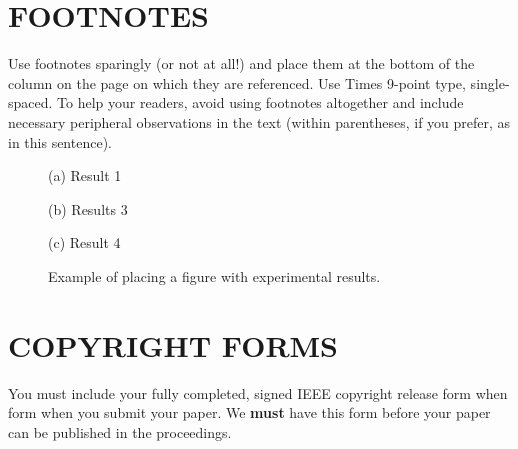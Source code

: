 \documentclass{article}
\begin{document}
\section{FOOTNOTES}
\label{sec:foot}

Use footnotes sparingly (or not at all!) and place them at the bottom of the
column on the page on which they are referenced. Use Times 9-point type,
single-spaced. To help your readers, avoid using footnotes altogether and
include necessary peripheral observations in the text (within parentheses, if
you prefer, as in this sentence).

\begin{figure}[htb]

\begin{minipage}[b]{1.0\linewidth}
  \centering
  \centerline{(a) Result 1}\medskip
\end{minipage}
%
\begin{minipage}[b]{.48\linewidth}
  \centering
  \centerline{(b) Results 3}\medskip
\end{minipage}
\hfill
\begin{minipage}[b]{0.48\linewidth}
  \centering
  \centerline{(c) Result 4}\medskip
\end{minipage}
%
\caption{Example of placing a figure with experimental results.}
\label{fig:res}
%
\end{figure}



\section{COPYRIGHT FORMS}
\label{sec:copyright}

You must include your fully completed, signed IEEE copyright release form when
form when you submit your paper. We {\bf must} have this form before your paper
can be published in the proceedings.
\end{document}
